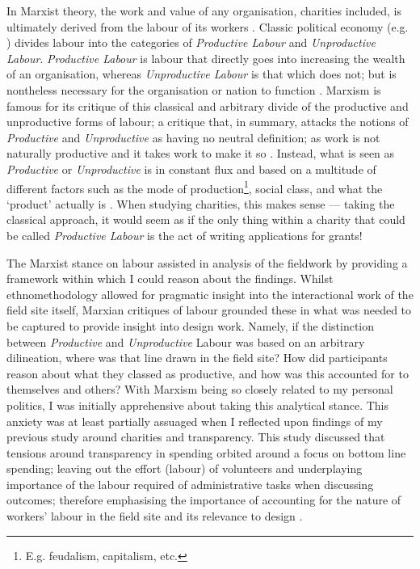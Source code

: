 In Marxist theory, the work and value of any organisation, charities included, is ultimately derived from the labour of its workers \cite{marx_contribution_1970}. Classic political economy (e.g. \cite{smith_inquiry_1785}) divides labour into the categories of \textit{Productive Labour} and \textit{Unproductive Labour}. \textit{Productive Labour} is labour that directly goes into increasing the wealth of an organisation, whereas \textit{Unproductive Labour} is that which does not; but is nontheless necessary for the organisation or nation to function \cite{smith_inquiry_1785}. Marxism is famous for its critique of this classical and arbitrary divide of the productive and unproductive forms of labour; a critique that, in summary, attacks the notions of \textit{Productive} and \textit{Unproductive} as having no neutral definition; as work is not naturally productive and it takes work to make it so \cite{marx_capital_1974, marx_theories_1964}. Instead, what is seen as \textit{Productive} or \textit{Unproductive} is in constant flux and based on a multitude of different factors such as the mode of production\footnote{E.g. feudalism, capitalism, etc.}, social class, and what the `product' actually is \cite{marx_capital_1974}. When studying charities, this makes sense --- taking the classical approach, it would seem as if the only thing within a charity that could be called \textit{Productive Labour} is the act of writing applications for grants!

The Marxist stance on labour assisted in analysis of the fieldwork by providing a framework within which I could reason about the findings. Whilst ethnomethodology allowed for pragmatic insight into the interactional work of the field site itself, Marxian critiques of labour grounded these in what was needed to be captured to provide insight into design work. Namely, if the distinction between \textit{Productive} and \textit{Unproductive} Labour was based on an arbitrary dilineation, where was that line drawn in the field site? How did participants reason about what they classed as productive, and how was this accounted for to themselves and others? With Marxism being so closely related to my personal politics, I was initially apprehensive about taking this analytical stance. This anxiety was at least partially assuaged when I reflected upon findings of my previous study around charities and transparency. This study discussed that tensions around transparency in spending orbited around a focus on bottom line spending; leaving out the effort (labour) of volunteers and underplaying importance of the labour required of administrative tasks when discussing outcomes; therefore emphasising the importance of accounting for the nature of workers' labour in the field site and its relevance to design \cite{marshall_accountable:_2016}.

